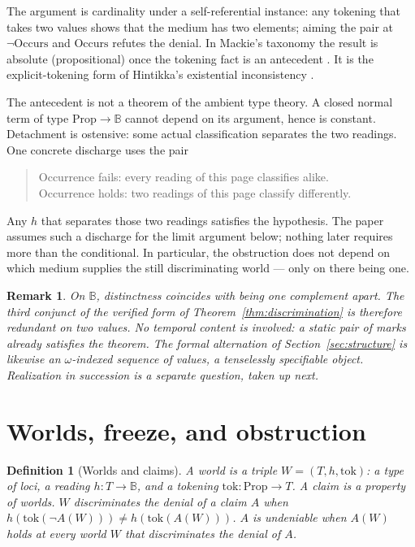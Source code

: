 \documentclass[11pt]{article}
\newtheorem{definition}[theorem]{Definition}
\newtheorem{remark}[theorem]{Remark}
\newcommand{\B}{\mathbb{B}}
\newcommand{\Occurs}{\mathrm{Occurs}}
\begin{document}
The argument is cardinality under a self-referential instance: any tokening
that takes two values shows that the medium has two elements; aiming the pair
at \(\lnot\Occurs\) and \(\Occurs\) refutes the denial. In Mackie's taxonomy
the result is absolute (propositional) once the tokening fact is an antecedent
\cite{mackie1964}. It is the explicit-tokening form of Hintikka's existential
inconsistency \cite{hintikka1962}.

The antecedent is not a theorem of the ambient type theory. A closed normal
term of type \(\mathrm{Prop}\to\B\) cannot depend on its argument, hence is
constant. Detachment is ostensive: some actual classification separates the
two readings. One concrete discharge uses the pair
\begin{quote}
Occurrence fails: every reading of this page classifies alike.\\
Occurrence holds: two readings of this page classify differently.
\end{quote}
Any \(h\) that separates those two readings satisfies the hypothesis. The
paper assumes such a discharge for the limit argument below; nothing later
requires more than the conditional. In particular, the obstruction does not
depend on which medium supplies the still discriminating world --- only on
there being one.

\begin{remark}
On \(\B\), distinctness coincides with being one complement apart. The third
conjunct of the verified form of Theorem~\ref{thm:discrimination} is therefore
redundant on two values. No temporal content is involved: a static pair of
marks already satisfies the theorem. The formal alternation of
Section~\ref{sec:structure} is likewise an \(\omega\)-indexed sequence of
values, a tenselessly specifiable object. Realization in succession is a
separate question, taken up next.
\end{remark}

\section{Worlds, freeze, and obstruction}
\label{sec:obstruction}

\begin{definition}[Worlds and claims]
\label{def:world}
A \emph{world} is a triple \(W=(T,h,\mathrm{tok})\): a type of loci, a reading
\(h:T\to\B\), and a tokening \(\mathrm{tok}:\mathrm{Prop}\to T\). A
\emph{claim} is a property of worlds. \(W\) \emph{discriminates the denial} of
a claim \(A\) when
\(h(\mathrm{tok}(\lnot A(W))) \neq h(\mathrm{tok}(A(W)))\). \(A\) is
\emph{undeniable} when \(A(W)\) holds at every world \(W\) that discriminates
the denial of \(A\).
\end{definition}
\end{document}
